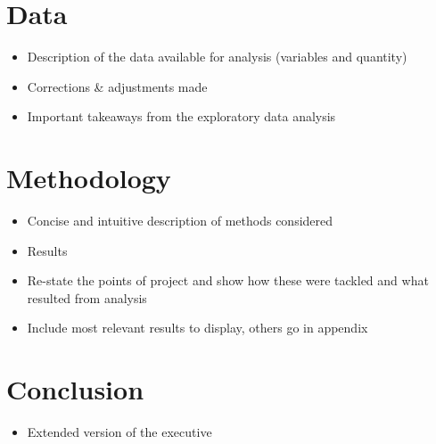 \documentclass[conference]{IEEEtran}
\begin{document}
\section{Data}
\begin{itemize}
  \item Description of the data available for analysis (variables and quantity)
  \item Corrections \& adjustments made
  \item Important takeaways from the exploratory data analysis
\end{itemize}



\section{Methodology}
\begin{itemize}
  \item Concise and intuitive description of methods considered
  \item Results
  \item Re-state the points of project and show how these were tackled and what resulted from analysis
  \item Include most relevant results to display, others go in appendix
\end{itemize}



\section{Conclusion}
\begin{itemize}
  \item Extended version of the executive 
\end{itemize}
\end{document}
